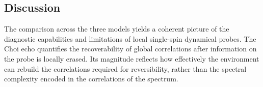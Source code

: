 \documentclass[pra,twocolumn,aps,showpacs,superscriptaddress,longbibliography]{revtex4-2}%
\newcommand{\choip}{\langle \text{Tr}[\mathcal{D}(t)^2] \rangle_{\mathrm{Haar}, T}} %
\newcommand{\statep}{\overline{\mathcal{P}}}
\newcommand{\mlsr}{\ev{\tilde{r}}}
\providecommand{\DIFadd}[1]{{\protect\color{blue} \sf #1}} %
\providecommand{\DIFdel}[1]{{\protect\color{red} \scriptsize #1}} %
\providecommand{\DIFaddbegin}{} %
\providecommand{\DIFaddend}{} %
\providecommand{\DIFdelbegin}{} %
\providecommand{\DIFdelend}{} %
\begin{document}
\DIFdelend 


\subsection{Discussion}\label{sec:discussion}
The comparison across the three models yields a coherent picture of the diagnostic capabilities and limitations of \DIFdelbegin \DIFdel{local }\DIFdelend \DIFaddbegin \DIFadd{single-spin }\DIFaddend dynamical probes. The Choi echo quantifies the recoverability of global correlations after information on the probe is locally erased. Its magnitude reflects how effectively the environment can rebuild the correlations required for reversibility, rather than the spectral complexity encoded in the correlations of the spectrum.
\end{document}
